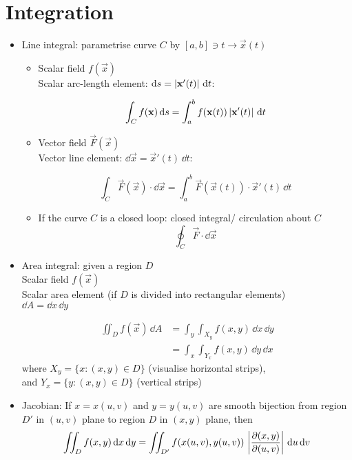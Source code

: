 \section{Integration}
\begin{itemize}
      \item Line integral: parametrise curve $C$ by $[a,b] \ni t \to \vec{x}(t)$
            \begin{itemize}

                  \item
                        Scalar field $f(\vec{x})$ \\
                        Scalar arc-length element: $\mathrm{d} s = \left| \boldsymbol{\mathbf{x}}'(t) \right| \, \mathrm{d} t $:

                        \[
                              \int_C f(\boldsymbol{\mathbf{x}}) \, \mathrm{d} s = \int_{a}^{b} f(\boldsymbol{\mathbf{x}}(t)) \left| \boldsymbol{\mathbf{x}}'(t) \right| \, \mathrm{d} t
                        \]

                  \item
                        Vector field $\vec{F}(\vec{x})$ \\
                        Vector line element: $\dd \vec{x} = \vec{x}'(t) \, \dd t$:

                        \[
                              \int_C \vec{F}(\vec{x}) \cdot \dd \vec{x} = \int_{a}^{b} \vec{F}(\vec{x}(t)) \cdot \vec{x}'(t) \, \dd t
                        \]

                  \item If the curve $C$ is a closed loop: closed integral/ circulation about $C$
                        \[\oint_C \vec{F}\cdot \dd \vec{x} \]
            \end{itemize}


      \item Area integral: given a region $D$ \\
            Scalar field $f(\vec{x})$ \\
            Scalar area element (if $D$ is divided into rectangular elements) \\
            $\dd A = \dd x \, \dd y$

            \begin{align*}
                  \iint_D f(\vec{x}) \, \dd A & = \int_y \int_{X_y} f(x,y) \, \dd x \, \dd y \\
                                              & = \int_x \int_{Y_x} f(x,y) \, \dd y \, \dd x
            \end{align*}
            where $X_y = \{x: (x,y) \in D\}$ (visualise horizontal strips), \\
            and $Y_x = \{y: (x,y) \in D\}$ (vertical strips)
      \item Jacobian: If $x= x(u,v)$ and $y=y(u,v)$ are smooth bijection from region $D'$ in $(u,v)$ plane to region $D$ in $(x,y)$ plane, then
            \[\iint_D f(x,y)  \, \mathrm{d} x \, \mathrm{d} y = \iint_{D'} f(x(u,v),y(u,v)) \, \left| \frac{\partial{(x,y)}}{\partial{(u,v)}} \right| \, \mathrm{d} u \, \mathrm{d} v\]


\end{itemize}
